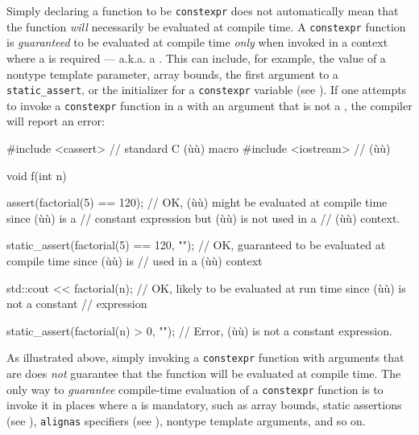 Simply declaring a function to be \lstinline!constexpr! does not
automatically mean that the function \emph{will} necessarily be
evaluated at compile time. A \lstinline!constexpr! function is
\emph{guaranteed} to be evaluated at compile time \emph{only} when
invoked in a context where a  is required
--- a.k.a. a . This can include, for
example, the value of a nontype template parameter, array bounds, the
first argument to a \lstinline!static_assert!, or the initializer for a
\lstinline!constexpr! variable (see ). If one attempts to invoke a \lstinline!constexpr! function
in a  with an argument that is not a
, the compiler will report an error:

\begin{emcppslisting}[emcppsbatch=e2]
#include <cassert>   // standard C (ù{}ù) macro
#include <iostream>  // (ù{}ù)

void f(int n)
{
    assert(factorial(5) == 120);
        // OK, (ù{}ù) might be evaluated at compile time since (ù{}ù) is a
        // constant expression but (ù{}ù) is not used in a
        // (ù{}ù) context.

    static_assert(factorial(5) == 120, "");
        // OK, guaranteed to be evaluated at compile time since (ù{}ù) is
        // used in a (ù{}ù) context

    std::cout << factorial(n);
        // OK, likely to be evaluated at run time since (ù{}ù) is not a constant
        // expression

    static_assert(factorial(n) > 0, "");
        // Error, (ù{}ù) is not a constant expression.
}
\end{emcppslisting}
    

\noindent As illustrated above, simply invoking a \lstinline!constexpr! function with
arguments that are  does \emph{not}
guarantee that the function will be evaluated at compile time. The only
way to \emph{guarantee} compile-time evaluation of a \lstinline!constexpr!
function is to invoke it in places where a 
is mandatory, such as array bounds, static assertions (see ), \lstinline!alignas! specifiers (see
), nontype template arguments,
and so on.

